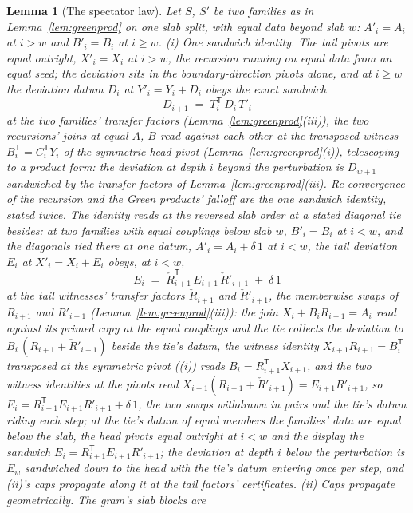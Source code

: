 \documentclass[11pt]{article}
\newtheorem{lemma}{Lemma}
\theoremstyle{definition}
\begin{document}
\begin{lemma}[The spectator law]\label{lem:spectator}
Let $S$, $S'$ be two families as in Lemma~\ref{lem:greenprod} on one slab
split, with equal data beyond slab $w$: $A'_i=A_i$ at $i>w$ and
$B'_i=B_i$ at $i\ge w$.
\emph{(i) One sandwich identity.} The tail pivots are equal outright, $X'_i=X_i$
at $i>w$, the recursion running on equal data from an equal seed; the
deviation sits in the boundary-direction pivots alone, and at $i\ge w$
the deviation datum $D_i$ at $Y'_i=Y_i+D_i$ obeys the exact sandwich
\[
D_{i+1}
\;=\;T_i^{\mathsf T}\,D_i\,T'_i
\]
at the two families' transfer factors
(Lemma~\ref{lem:greenprod}(iii)),
the two recursions' joins at equal $A$, $B$ read against each other
at the transposed witness $B_i^{\mathsf T}=C_i^{\mathsf T}Y_i$ of the
symmetric head pivot (Lemma~\ref{lem:greenprod}(i)),
telescoping to a product form: the deviation at depth $i$ beyond the
perturbation is $D_{w+1}$ sandwiched by the transfer factors of
Lemma~\ref{lem:greenprod}(iii). Re-convergence of the recursion and the
Green products' falloff are the one sandwich identity, stated twice.
The identity reads at the reversed slab order at a stated diagonal tie
besides: at two families with equal couplings below slab $w$,
$B'_i=B_i$ at $i<w$, and the diagonals tied there at one datum,
$A'_i=A_i+\delta\,1$ at $i<w$, the tail deviation $E_i$ at
$X'_i=X_i+E_i$ obeys, at $i<w$,
\[
E_i\;=\;\check R_{i+1}^{\mathsf T}\,E_{i+1}\,\check R'_{i+1}
\;+\;\delta\,1
\]
at the tail witnesses' transfer factors $\check R_{i+1}$ and
$\check R'_{i+1}$, the memberwise swaps of $R_{i+1}$ and $R'_{i+1}$
(Lemma~\ref{lem:greenprod}(iii)): the join
$X_i+B_iR_{i+1}=A_i$ read against its primed copy at the equal
couplings and the tie collects the deviation to
$B_i\,(R_{i+1}+\check R'_{i+1})$ beside the tie's datum, the witness
identity $X_{i+1}R_{i+1}=B_i^{\mathsf T}$ transposed at the symmetric
pivot ((i)) reads $B_i=R_{i+1}^{\mathsf T}X_{i+1}$, and the two witness
identities at the pivots read
$X_{i+1}(R_{i+1}+\check R'_{i+1})=E_{i+1}R'_{i+1}$, so
$E_i=R_{i+1}^{\mathsf T}E_{i+1}R'_{i+1}+\delta\,1$, the two swaps
withdrawn in pairs and the tie's datum riding each step; at the tie's
datum of equal members the families' data are equal below the slab,
the head pivots equal outright at $i<w$ and the display the sandwich
$E_i=R_{i+1}^{\mathsf T}E_{i+1}R'_{i+1}$; the deviation at depth $i$
below the perturbation is $E_w$ sandwiched down to the head with the
tie's datum entering once per step, and (ii)'s caps propagate along it
at the tail factors' certificates.
\emph{(ii) Caps propagate geometrically.} The gram's slab blocks are

\end{lemma}
\end{document}
